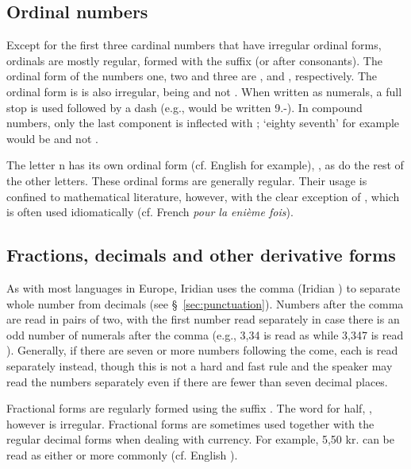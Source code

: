 \subsection{Ordinal numbers}
\label{sec:ordinals}

Except for the first three cardinal numbers that have irregular ordinal forms,
ordinals are mostly regular, formed with the suffix  (or 
after consonants). The ordinal form of the numbers one, two and three are
,  and , respectively. The ordinal form is
 is also irregular, being  and not . When
written as numerals, a full stop is used followed by a dash (e.g.,
 would be written 9.-). In compound numbers, only the last
component is inflected with ; `eighty seventh' for example would be
 and not .

The letter n has its own ordinal form (cf. English  for example),
, as do the rest of the other letters. These ordinal forms are
generally regular. Their usage is confined to mathematical literature, however,
with the clear exception of , which is often used idiomatically (cf.
French \textit{pour la enième fois}).


\subsection{Fractions, decimals and other derivative forms}
\label{sec:fractions}

As with most languages in Europe, Iridian uses the comma (Iridian ) to
separate whole number from decimals (see \S~\ref{sec:punctuation}). Numbers
after the comma are read in pairs of two, with the first number read separately
in case there is an odd number of numerals after the comma (e.g., 3,34 is read
as  while 3,347 is read ). Generally, if there are seven or more numbers following the come,
each is read separately instead, though this is not a hard and fast rule and the
speaker may read the numbers separately even if there are fewer than seven
decimal places.

Fractional forms are regularly formed using the suffix . The word
for half, , however is irregular. Fractional forms are sometimes used
together with the regular decimal forms when dealing with currency. For example,
5,50 kr. can be read as either  or more commonly
 (cf. English ).


